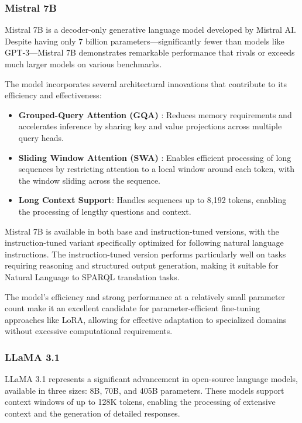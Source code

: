 \subsubsection{Mistral 7B}
\label{chap2:mistral-7b}
Mistral 7B \citep{jiang2023mistral7b} is a decoder-only generative language model developed by Mistral AI. Despite having only 7 billion parameters---significantly fewer than models like GPT-3---Mistral 7B demonstrates remarkable performance that rivals or exceeds much larger models on various benchmarks.

The model incorporates several architectural innovations that contribute to its efficiency and effectiveness:

\begin{itemize}
    \item \textbf{Grouped-Query Attention (GQA)} \citep{ainslie-etal-2023-gqa}: Reduces memory requirements and accelerates inference by sharing key and value projections across multiple query heads.
    \item \textbf{Sliding Window Attention (SWA)} \citep{beltagy2020longformerlongdocumenttransformer,child2019generatinglongsequencessparse}: Enables efficient processing of long sequences by restricting attention to a local window around each token, with the window sliding across the sequence.
    \item \textbf{Long Context Support}: Handles sequences up to 8,192 tokens, enabling the processing of lengthy questions and context.
\end{itemize}

Mistral 7B is available in both base and instruction-tuned versions, with the instruction-tuned variant specifically optimized for following natural language instructions. The instruction-tuned version performs particularly well on tasks requiring reasoning and structured output generation, making it suitable for Natural Language to SPARQL translation tasks.

The model's efficiency and strong performance at a relatively small parameter count make it an excellent candidate for parameter-efficient fine-tuning approaches like LoRA, allowing for effective adaptation to specialized domains without excessive computational requirements.

\subsubsection{LLaMA 3.1}
LLaMA 3.1 \citep{llama3dubey} represents a significant advancement in open-source language models, available in three sizes: 8B, 70B, and 405B parameters. These models support context windows of up to 128K tokens, enabling the processing of extensive context and the generation of detailed responses.

